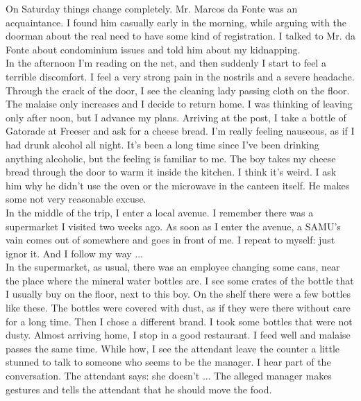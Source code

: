 \documentclass[11pt]{book}
\begin{document}
\noindent On Saturday things change completely. Mr. Marcos da Fonte was an acquaintance. I found him casually early in the morning, while arguing with the doorman about the real need to have some kind of registration. I talked to Mr. da Fonte about condominium issues and told him about my kidnapping. \\

\noindent In the afternoon I'm reading on the net, and then suddenly I start to feel a terrible discomfort. I feel a very strong pain in the nostrils and a severe headache. Through the crack of the door, I see the cleaning lady passing cloth on the floor. \\

\noindent The malaise only increases and I decide to return home. I was thinking of leaving only after noon, but I advance my plans. Arriving at the post, I take a bottle of Gatorade at Freeser and ask for a cheese bread. I'm really feeling nauseous, as if I had drunk alcohol all night. It's been a long time since I've been drinking anything alcoholic, but the feeling is familiar to me. The boy takes my cheese bread through the door to warm it inside the kitchen. I think it's weird. I ask him why he didn't use the oven or the microwave in the canteen itself. He makes some not very reasonable excuse. \\

 In the middle of the trip, I enter a local avenue. I remember there was a supermarket I visited two weeks ago. As soon as I enter the avenue, a SAMU's vain comes out of somewhere and goes in front of me. I repeat to myself: just ignor it. And I follow my way ... \\
 
In the supermarket, as usual, there was an employee changing some cans, near the place where the mineral water bottles are. I see some crates of the bottle that I usually buy on the floor, next to this boy. On the shelf there were a few bottles like these. The bottles were covered with dust, as if they were there without care for a long time. Then I chose a different brand. I took some bottles that were not dusty. Almost arriving home, I stop in a good restaurant. I feed well and malaise passes the same time. While how, I see the attendant leave the counter a little stunned to talk to someone who seems to be the manager. I hear part of the conversation. The attendant says: she doesn't ... The alleged manager makes gestures and tells the attendant that he should move the food.\\
\end{document}
